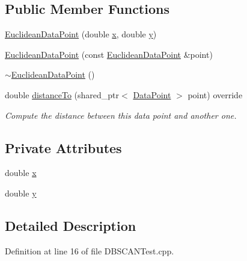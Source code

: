 \subsection*{Public Member Functions}
\begin{DoxyCompactItemize}
\item 
\hyperlink{classEuclideanDataPoint_acda27e957f18603d1b790d037ab5b74a}{Euclidean\-Data\-Point} (double \hyperlink{classEuclideanDataPoint_a7d3a3555621c6fd195f2f0543e04eaf6}{x}, double \hyperlink{classEuclideanDataPoint_a108d29336be8bf0bd1aa53c40df3bd68}{y})
\item 
\hyperlink{classEuclideanDataPoint_a8037034faddfd74eb85f7879bb8e7e06}{Euclidean\-Data\-Point} (const \hyperlink{classEuclideanDataPoint}{Euclidean\-Data\-Point} \&point)
\item 
\hyperlink{classEuclideanDataPoint_a8ee5a1033aba4baa58692f0ae896fbf8}{$\sim$\-Euclidean\-Data\-Point} ()
\item 
double \hyperlink{classEuclideanDataPoint_a86ac3981ea67375c7854e9d84446f8e5}{distance\-To} (shared\-\_\-ptr$<$ \hyperlink{classmultiscale_1_1analysis_1_1DataPoint}{Data\-Point} $>$ point) override
\begin{DoxyCompactList}\small\item\em Compute the distance between this data point and another one. \end{DoxyCompactList}\end{DoxyCompactItemize}
\subsection*{Private Attributes}
\begin{DoxyCompactItemize}
\item 
double \hyperlink{classEuclideanDataPoint_a7d3a3555621c6fd195f2f0543e04eaf6}{x}
\item 
double \hyperlink{classEuclideanDataPoint_a108d29336be8bf0bd1aa53c40df3bd68}{y}
\end{DoxyCompactItemize}


\subsection{Detailed Description}


Definition at line 16 of file D\-B\-S\-C\-A\-N\-Test.\-cpp.



